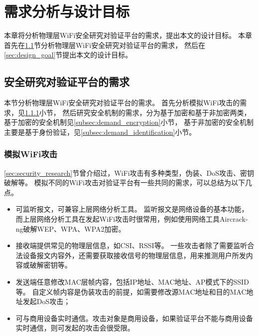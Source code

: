 
\chapter{需求分析与设计目标}\label{chap:demand}
本章将分析物理层WiFi安全研究对验证平台的需求，提出本文的设计目标。
本章首先在\ref{sec:platform_demand}节分析物理层WiFi安全研究对验证平台的需求，
然后在\ref{sec:design_goal}节提出本文的设计目标。

	\section{安全研究对验证平台的需求}\label{sec:platform_demand}
	本节分析物理层WiFi安全研究对验证平台的需求。
	首先分析模拟WiFi攻击的需求，见\ref{subsec:demand_perform_attack}小节，
	然后研究安全机制的需求，分为基于加密和基于非加密两类，基于加密的安全机制见\ref{subsec:demand_encryption}小节，
	基于非加密的安全机制主要是基于身份验证，见\ref{subsec:demand_identification}小节。

		\subsection{模拟WiFi攻击}\label{subsec:demand_perform_attack}
		\ref{sec:security_research}节曾介绍过，WiFi攻击有多种类型，伪装、DoS攻击、密钥破解等。
		模拟不同的WiFi攻击对验证平台有一些共同的需求，可以总结为以下几点。
		\begin{itemize}
			\item 可监听报文，可兼容上层网络分析工具。
			监听报文是网络设备的基本功能，而上层网络分析工具在发起WiFi攻击时很常用，例如使用网络工具Aircrack-ng破解WEP、WPA、WPA2加密\cite{ijarcet12wpa2}。
			\item 接收端提供常见的物理层信息，如CSI、RSSI等。
			一些攻击者除了需要监听合法设备报文内容外，还需要获取接收信号的物理层信息，用来推测用户所发内容\cite{ccs16csi}或破解密钥\cite{cns15key}等。
			\item 发送端任意修改MAC层帧内容，包括IP地址、MAC地址、AP模式下的SSID等。
			自定义帧内容是伪装攻击的前提，如需要修改源MAC地址和目的MAC地址发起DoS攻击\cite{wisec06spoofing}；
			\item 可与商用设备实时通信。攻击对象是商用设备，如果验证平台不能与商用设备实时通信，则可发起的攻击会很受限。
		\end{itemize}

